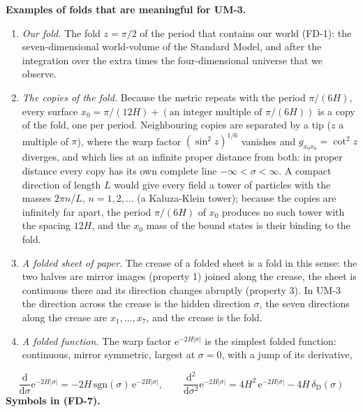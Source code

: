 \documentclass[
  10pt,
]{article}
\providecommand{\tightlist}{%
  \setlength{\itemsep}{0pt}\setlength{\parskip}{0pt}}
\begin{document}
\textbf{Examples of folds that are meaningful for UM-3.}

\begin{enumerate}
\def\labelenumi{\arabic{enumi}.}
\tightlist
\item
  \emph{Our fold.} The fold \(z = \pi/2\) of the period that contains
  our world (FD-1): the seven-dimensional world-volume of the Standard
  Model, and after the integration over the extra times the
  four-dimensional universe that we observe.
\item
  \emph{The copies of the fold.} Because the metric repeats with the
  period \(\pi/(6H)\), every surface
  \(x_0 = \pi/(12H) + (\text{an integer multiple of } \pi/(6H))\) is a
  copy of the fold, one per period. Neighbouring copies are separated by
  a tip (\(z\) a multiple of \(\pi\)), where the warp factor
  \((\sin^2z)^{1/6}\) vanishes and \(g_{x_0x_0} = \cot^2z\) diverges,
  and which lies at an infinite proper distance from both: in proper
  distance every copy has its own complete line
  \(-\infty < \sigma < \infty\). A compact direction of length \(L\)
  would give every field a tower of particles with the masses
  \(2\pi n/L\), \(n = 1, 2, \dots\) (a Kaluza-Klein tower); because the
  copies are infinitely far apart, the period \(\pi/(6H)\) of \(x_0\)
  produces no such tower with the spacing \(12H\), and the \(x_0\) mass
  of the bound states is their binding to the fold.
\item
  \emph{A folded sheet of paper.} The crease of a folded sheet is a fold
  in this sense: the two halves are mirror images (property 1) joined
  along the crease, the sheet is continuous there and its direction
  changes abruptly (property 3). In UM-3 the direction across the crease
  is the hidden direction \(\sigma\), the seven directions along the
  crease are \(x_1, \dots, x_7\), and the crease is the fold.
\item
  \emph{A folded function.} The warp factor
  \(\mathrm{e}^{-2H\lvert\sigma\rvert}\) is the simplest folded
  function: continuous, mirror symmetric, largest at \(\sigma = 0\),
  with a jump of its derivative,
\end{enumerate}

\[
\frac{\mathrm{d}}{\mathrm{d}\sigma}\mathrm{e}^{-2H\lvert\sigma\rvert} = -2H\,\mathrm{sgn}(\sigma)\,\mathrm{e}^{-2H\lvert\sigma\rvert},\qquad
\frac{\mathrm{d}^2}{\mathrm{d}\sigma^2}\mathrm{e}^{-2H\lvert\sigma\rvert} = 4H^2\,\mathrm{e}^{-2H\lvert\sigma\rvert} - 4H\,\delta_{\mathrm{D}}(\sigma) \tag{FD-7}
\] \textbf{Symbols in (FD-7).}
\end{document}
